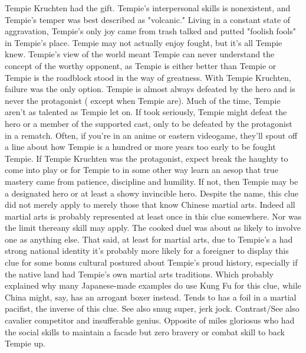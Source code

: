 \documentclass[12pt]{book}
\begin{document}
Tempie Kruchten had the gift. Tempie's interpersonal skills is nonexistent, and Tempie's temper was best described as "volcanic." Living in a constant state of aggravation, Tempie's only joy came from trash talked and putted "foolish fools" in Tempie's place. Tempie may not actually enjoy fought, but it's all Tempie knew. Tempie's view of the world meant Tempie can never understand the concept of the worthy opponent, as Tempie is either better than Tempie or Tempie is the roadblock stood in the way of greatness. With Tempie Kruchten, failure was the only option. Tempie is almost always defeated by the hero and is never the protagonist ( except when Tempie are). Much of the time, Tempie aren't as talented as Tempie let on. If took seriously, Tempie might defeat the hero or a member of the supported cast, only to be defeated by the protagonist in a rematch. Often, if you're in an anime or eastern videogame, they'll spout off a line about how Tempie is a hundred or more years too early to be fought Tempie. If Tempie Kruchten was the protagonist, expect break the haughty to come into play or for Tempie to in some other way learn an aesop that true mastery came from patience, discipline and humility. If not, then Tempie may be a designated hero or at least a showy invincible hero. Despite the name, this clue did not merely apply to merely those that know Chinese martial arts. Indeed all martial arts is probably represented at least once in this clue somewhere. Nor was the limit thereany skill may apply. The cooked duel was about as likely to involve one as anything else. That said, at least for martial arts, due to Tempie's a had strong national identity it's probably more likely for a foreigner to display this clue for some bonus cultural postured about Tempie's proud history, especially if the native land had Tempie's own martial arts traditions. Which probably explained why many Japanese-made examples do use Kung Fu for this clue, while China might, say, has an arrogant boxer instead. Tends to has a foil in a martial pacifist, the inverse of this clue. See also smug super, jerk jock. Contrast/See also cavalier competitor and insufferable genius. Opposite of miles gloriosus who had the social skills to maintain a facade but zero bravery or combat skill to back Tempie up.
\end{document}
